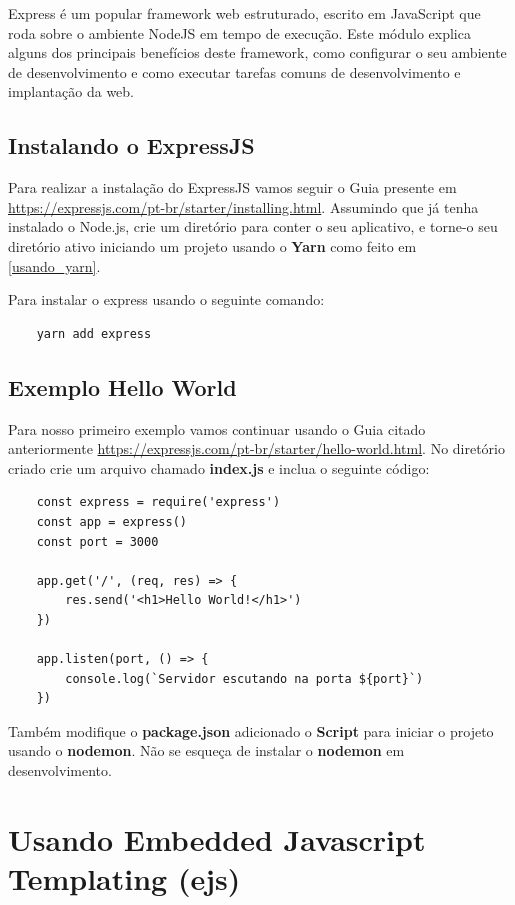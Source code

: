 Express é um popular framework web estruturado, escrito em JavaScript que roda sobre o ambiente NodeJS em tempo de execução. Este módulo explica alguns dos principais benefícios deste framework, como configurar o seu ambiente de desenvolvimento e como executar tarefas comuns de desenvolvimento e implantação da web.

\subsection{Instalando o ExpressJS}

Para realizar a instalação do ExpressJS vamos seguir o Guia presente em \url{https://expressjs.com/pt-br/starter/installing.html}. Assumindo que já tenha instalado o Node.js, crie um diretório para conter o seu aplicativo, e torne-o seu diretório ativo iniciando um projeto usando o \textbf{Yarn} como feito em \ref{usando_yarn}.

Para instalar o express usando o seguinte comando:

\begin{verbatim}
	yarn add express
\end{verbatim}

\subsection{Exemplo Hello World}
Para nosso primeiro exemplo vamos continuar usando o Guia citado anteriormente \url{https://expressjs.com/pt-br/starter/hello-world.html}. No diretório criado crie um arquivo chamado \textbf{index.js} e inclua o seguinte código:

\begin{verbatim}
	const express = require('express')
	const app = express()
	const port = 3000
	
	app.get('/', (req, res) => {
		res.send('<h1>Hello World!</h1>')
	})
	
	app.listen(port, () => {
		console.log(`Servidor escutando na porta ${port}`)
	})
\end{verbatim}

Também modifique o \textbf{package.json} adicionado o \textbf{Script} para iniciar o projeto usando o \textbf{nodemon}. Não se esqueça de instalar o \textbf{nodemon} em desenvolvimento.

\section{Usando Embedded Javascript Templating (ejs)}

